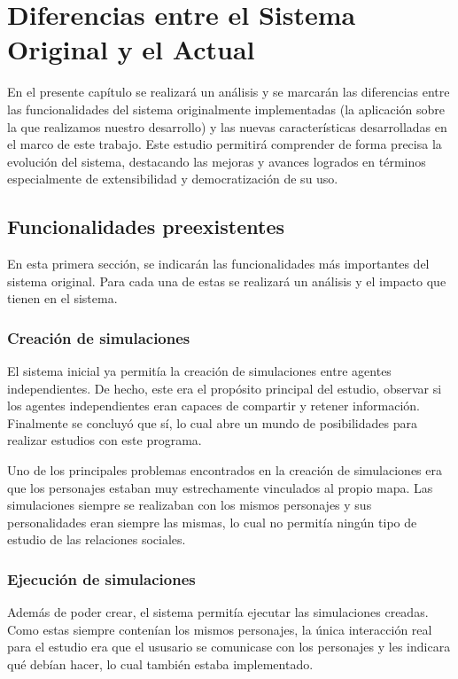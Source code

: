 \chapter{Diferencias entre el Sistema Original y el Actual}
\label{cap:descripcionTrabajo}


En el presente capítulo se realizará un análisis y se marcarán las diferencias entre las funcionalidades del sistema originalmente implementadas (la aplicación sobre la que realizamos nuestro desarrollo) y las nuevas características desarrolladas en el marco de este trabajo. Este estudio permitirá comprender de forma precisa la evolución del sistema, destacando las mejoras y avances logrados en términos especialmente de extensibilidad y democratización de su uso.

\section{Funcionalidades preexistentes}

En esta primera sección, se indicarán las funcionalidades más importantes del sistema original. Para cada una de estas se realizará un análisis y el impacto que tienen en el sistema.

\subsection{Creación de simulaciones}
El sistema inicial ya permitía la creación de simulaciones entre agentes independientes. De hecho, este era el propósito principal del estudio, observar si los agentes independientes eran capaces de compartir y retener información. Finalmente se concluyó que sí, lo cual abre un mundo de posibilidades para realizar estudios con este programa.

Uno de los principales problemas encontrados en la creación de simulaciones era que los personajes estaban muy estrechamente vinculados al propio mapa. Las simulaciones siempre se realizaban con los mismos personajes y sus personalidades eran siempre las mismas, lo cual no permitía ningún tipo de estudio de las relaciones sociales.

\subsection{Ejecución de simulaciones}
Además de poder crear, el sistema permitía ejecutar las simulaciones creadas. Como estas siempre contenían los mismos personajes, la única interacción real para el estudio era que el ususario se comunicase con los personajes y les indicara qué debían hacer, lo cual también estaba implementado.

